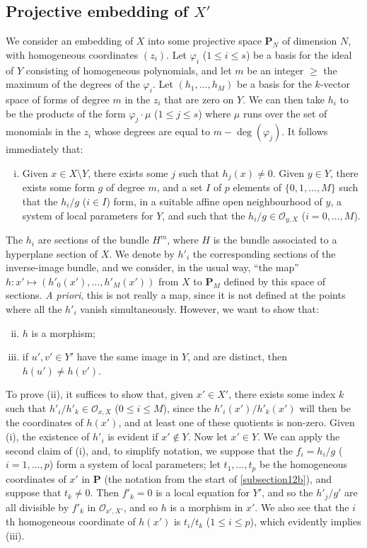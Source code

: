 \documentclass{article}
\theoremstyle{plain}
\theoremstyle{definition}
\newcommand{\sh}{\mathscr}
\newcommand{\PP}{\mathbf{P}}
\renewcommand{\geq}{\geqslant}
\renewcommand{\leq}{\leqslant}
\newcommand{\oldpage}[1]{\marginpar{\footnotesize$\Big\vert$ \textit{p.~#1}}}
\begin{document}
\subsection{Projective embedding of $X'$}
\label{subsection12c}

We consider an embedding of $X$ into some projective space $\PP_N$ of dimension $N$, with homogeneous coordinates $(z_i)$.
Let $\varphi_i$ ($1\leq i\leq s$) be a basis for the ideal of $Y$ consisting of homogeneous polynomials, and let $m$ be an integer $\geq$ the maximum of the degrees of the $\varphi_i$.
Let $(h_1,\ldots,h_M)$ be a basis for the $k$-vector space of forms of degree $m$ in the $z_i$ that are zero on $Y$.
We can then take $h_i$ to be the products of the form $\varphi_j\cdot\mu$ ($1\leq j\leq s$) where $\mu$ runs over the set of monomials in the $z_i$ whose degrees are equal to $m-\deg(\varphi_j)$.
It follows immediately that:
\begin{enumerate}[(i)]
  \item Given $x\in X\setminus Y$, there exists some $j$ such that $h_j(x)\neq0$.
    Given $y\in Y$, there exists some form $g$ of degree $m$, and a set $I$ of $p$ elements of $\{0,1,\ldots,M\}$ such that the $h_i/g$ ($i\in I$) form, in a suitable affine open neighbourhood of $y$, a system of local parameters for $Y$, and such that the $h_i/g\in\sh{O}_{y,X}$ ($i=0,\ldots,M$).
\end{enumerate}

The $h_i$ are  sections of the bundle $H^m$, where $H$ is the bundle associated to a hyperplane section of $X$.
We denote by $h'_i$ the corresponding sections of the inverse-image bundle, and we consider, in the usual way, ``the map'' $h\colon x'\mapsto(h'_0(x'),\ldots,h'_M(x'))$ from $X$ to $\PP_M$ defined by this space of sections.
\emph{A priori}, this is not really a map, since it is not defined at the points where all the $h'_i$ vanish simultaneously.
However, we want to show that:

\begin{enumerate}[(i)]
  \setcounter{enumi}{1}
  \item $h$ is a morphism;
  \item if $u',v'\in Y'$ have the same image in $Y$, and are distinct, then $h(u')\neq h(v')$.
\end{enumerate}

To prove (ii), it suffices to show that, given $x'\in X'$, there exists some index $k$ such that $h'_i/h'_k\in\sh{O}_{x,X}$ ($0\leq i\leq M$), since the $h'_i(x')/h'_k(x')$ will then be the coordinates of $h(x')$, and at least one of these quotients is non-zero.
Given (i), the existence of $h'_i$ is evident if $x'\not\in Y$.
Now let $x'\in Y$.
We can apply the second claim of (i), and, to simplify notation,
\oldpage{128}
we suppose that the $f_i=h_i/g$ ($i=1,\ldots,p$) form a system of local parameters;
let $t_1,\ldots,t_p$ be the homogeneous coordinates of $x'$ in $\PP$ (the notation from the start of \cref{subsection12b}), and suppose that $t_k\neq0$.
Then $f'_k=0$ is a local equation for $Y'$, and so the $h'_j/g'$ are all divisible by $f'_k$ in $\sh{O}_{x',X'}$, and so $h$ is a morphism in $x'$.
We also see that the $i$th homogeneous coordinate of $h(x')$ is $t_i/t_k$ ($1\leq i\leq p$), which evidently implies (iii).
\end{document}
